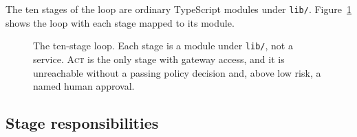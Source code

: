 \documentclass[10pt,twocolumn,a4paper]{article}
\newcommand{\code}[1]{\texttt{\small #1}}
\newcommand{\stage}[1]{\textsc{#1}}
\begin{document}
The ten stages of the loop are ordinary TypeScript modules under \code{lib/}.
Figure~\ref{fig:loop} shows the loop with each stage mapped to its module.

\begin{figure}[t]
  \centering
  \resizebox{\textwidth}{!}{}
  \caption{The ten-stage loop. Each stage is a module under \code{lib/}, not a
  service. \stage{Act} is the only stage with gateway access, and it is
  unreachable without a passing policy decision and, above low risk, a named
  human approval.}
  \label{fig:loop}
\end{figure}

\subsection{Stage responsibilities}
\end{document}
